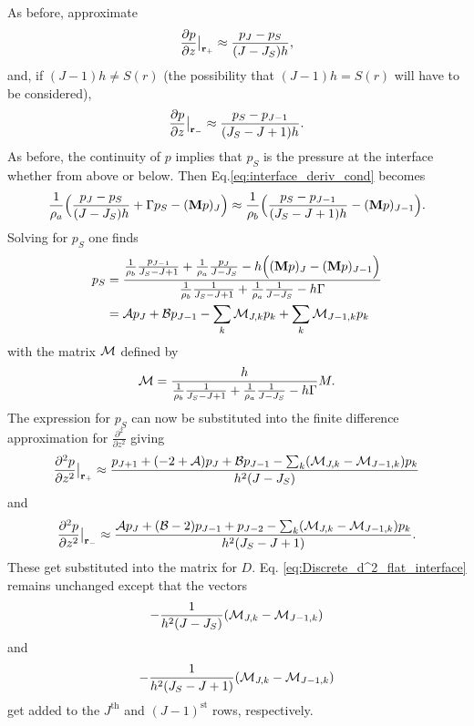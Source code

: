 As before, approximate 
\[
\frac{\partial p}{\partial z}\big|_{{\bf r}_+}\approx\frac{p_J-p_S}{(J-J_S)h},
\]
and, if $(J-1)h\ne S(r)$ (the possibility that $(J-1)h = S(r)$ will have to be considered), 
\[
\frac{\partial p}{\partial z}\big|_{{\bf r}_-}\approx\frac{p_S-p_{J-1}}{(J_S-J+1)h}.
\]
As before, the continuity of $p$ implies that $p_S$ is the pressure at the interface whether from above or below. Then Eq.\ref{eq:interface_deriv_cond} becomes 
\[
\frac{1}{\rho_a}\Big(\frac{p_J-p_S}{(J-J_S)h}+\Gamma p_S-({\bf M}p)_J\Big)
\approx
\frac{1}{\rho_b}\Big(\frac{p_S-p_{J-1}}{(J_S-J+1)h}-({\bf M}p)_{J-1}\Big).
\]
Solving for $p_S$ one finds 
\[
\begin{aligned}
p_S
&=
\frac{
	\frac{1}{\rho_b}\frac{p_{J-1}}{J_S-J+1}
	+
	\frac{1}{\rho_a}\frac{p_J}{J-J_S}
	-h\Big(({\bf M}p)_J-({\bf M}p)_{J-1}\Big)
}
{
	\frac{1}{\rho_b}\frac{1}{J_S-J+1}+\frac{1}{\rho_a}\frac{1}{J-J_S}-h\Gamma
}
\\
&={\cal A}p_J+{\cal B}p_{J-1}-\sum_k {\cal M}_{J,k}p_k+\sum_k {\cal M}_{J-1,k}p_k
\end{aligned}
\]
with the matrix ${\cal M}$ defined by 
\[
{\cal M}=
\frac{h}
{
	\frac{1}{\rho_b}\frac{1}{J_S-J+1}+\frac{1}{\rho_a}\frac{1}{J-J_S}-h\Gamma
}
M.
\]
The expression for $p_S$ can now be substituted into the finite difference approximation for $\frac{\partial^2}{\partial z^2}$ giving 
\[
\frac{\partial^2 p}{\partial z^2}\big|_{{\bf r}_+}
\approx\frac{p_{J+1}+(-2+{\cal A})p_J+{\cal B}p_{J-1}-\sum_k ({\cal M}_{J,k}-{\cal M}_{J-1,k})p_k}{h^2(J-J_S)}
\] 
and 
\[
\frac{\partial^2 p}{\partial z^2}\big|_{{\bf r}_-}
\approx\frac{{\cal A}p_J+({\cal B}-2)p_{J-1}+p_{J-2}-\sum_k ({\cal M}_{J,k}-{\cal M}_{J-1,k})p_k}{h^2(J_S-J+1)}.
\]
These get substituted into the matrix for $D$. Eq. \ref{eq:Discrete_d^2_flat_interface} remains unchanged except that the vectors
\[
-\frac{1}{h^2(J-J_S)}({\cal M}_{J,k}-{\cal M}_{J-1,k})
\]
and
\[
-\frac{1}{h^2(J_S-J+1)}({\cal M}_{J,k}-{\cal M}_{J-1,k})
\]
get added to the $J^\text{th}$ and $(J-1)^\text{st}$ rows, respectively. 

